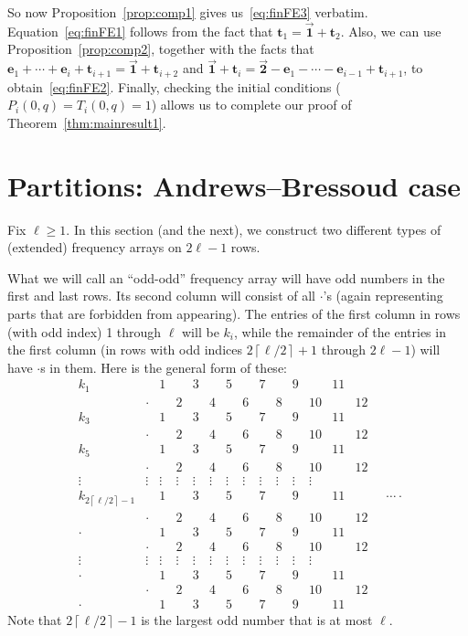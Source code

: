 \documentclass[10pt,a4paper]{amsart}
\numberwithin{equation}{section}
\theoremstyle{definition}
\newcommand{\tr}{\mathbf{t}}
\newcommand{\ee}{\mathbf{e}}
\newcommand{\two}{\vec{\mathbf{2}}}
\newcommand{\one}{\vec{\mathbf{1}}}
\begin{document}
So now Proposition~\ref{prop:comp1} gives us~\eqref{eq:finFE3} verbatim. Equation~\eqref{eq:finFE1} follows from the fact that $\tr_1=\one+\tr_2$. Also, we can use Proposition~\ref{prop:comp2}, together with the facts that $\ee_1+\cdots+\ee_{i}+\tr_{i+1} = \one+\tr_{i+2}$ and $\one+\tr_{i} =\two-\ee_1-\cdots-\ee_{i-1}+\tr_{i+1}$, to obtain~\eqref{eq:finFE2}. Finally, checking the initial conditions ($P_i(0,q)=T_i(0,q)=1$) allows us to complete our proof of Theorem~\ref{thm:mainresult1}.

\section{Partitions: Andrews--Bressoud case}\label{sec:partitions4}

Fix $\ell\ge1$. In this section (and the next), we construct two different types of (extended) frequency arrays on $2\ell-1$ rows.

What we will call an ``odd-odd'' frequency array will have odd numbers in the first and last rows. Its second column will consist of all $\cdot$'s (again representing parts that are forbidden from appearing). The entries of the first column in rows (with odd index) 1 through $\ell$ will be $k_i$, while the remainder of the entries in the first column (in rows with odd indices $2\left\lceil \ell/2\right\rceil+1$ through $2\ell-1$) will have $\cdot$s in them. Here is the general form of these:
\begin{equation*}
\begin{matrix}
k_1 && 1 && 3 && 5 && 7 && 9 && 11 & \\
& \cdot && 2 && 4 && 6 && 8 && 10 && 12\\
k_3 && 1 && 3 && 5 && 7 && 9 && 11 & \\
& \cdot && 2 && 4 && 6 && 8 && 10 && 12\\
k_5 && 1 && 3 && 5 && 7 && 9 && 11 & \\
& \cdot && 2 && 4 && 6 && 8 && 10 && 12\\
\vdots & \vdots &\vdots& \vdots &\vdots& \vdots &\vdots& \vdots &\vdots& \vdots &\vdots& \vdots\\
k_{2\left\lceil \ell/2\right\rceil-1} && 1 && 3 && 5 && 7 && 9 && 11 & \\
& \cdot && 2 && 4 && 6 && 8 && 10 && 12\\
\cdot && 1 && 3 && 5 && 7 && 9 && 11 & \\
& \cdot && 2 && 4 && 6 && 8 && 10 && 12\\
\vdots & \vdots &\vdots& \vdots &\vdots& \vdots &\vdots& \vdots &\vdots& \vdots &\vdots& \vdots\\
\cdot && 1 && 3 && 5 && 7 && 9 && 11 & \\
& \cdot && 2 && 4 && 6 && 8 && 10 && 12 \\
\cdot && 1 && 3 && 5 && 7 && 9 && 11 &
 \end{matrix}\quad\dots \,.
\end{equation*}
Note that $2\left\lceil \ell/2\right\rceil-1$ is the largest odd number that is at most $\ell$.
\end{document}
